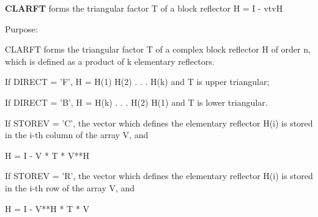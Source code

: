 {\bfseries C\+L\+A\+R\+F\+T} forms the triangular factor T of a block reflector H = I -\/ vtv\+H 

 \begin{DoxyParagraph}{Purpose\+: }
\begin{DoxyVerb} CLARFT forms the triangular factor T of a complex block reflector H
 of order n, which is defined as a product of k elementary reflectors.

 If DIRECT = 'F', H = H(1) H(2) . . . H(k) and T is upper triangular;

 If DIRECT = 'B', H = H(k) . . . H(2) H(1) and T is lower triangular.

 If STOREV = 'C', the vector which defines the elementary reflector
 H(i) is stored in the i-th column of the array V, and

    H  =  I - V * T * V**H

 If STOREV = 'R', the vector which defines the elementary reflector
 H(i) is stored in the i-th row of the array V, and

    H  =  I - V**H * T * V\end{DoxyVerb}
 
\end{DoxyParagraph}

